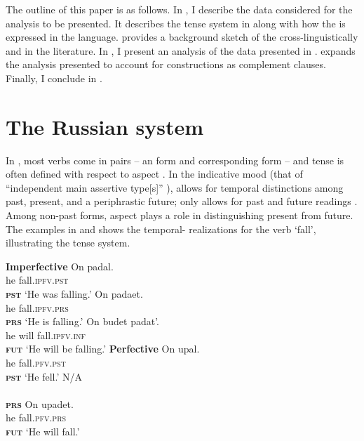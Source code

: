 \documentclass[output=paper,modfonts,newtxmath,hidelinks,]{langscibook}
\begin{document}
The outline of this paper is as follows. In , I describe the data considered for the analysis to be presented. It describes the tense system in  along with how the  is expressed in the language.  provides a background sketch of the  cross-linguistically and in the literature. In , I present an analysis of the data presented in .  expands the analysis presented to account for   constructions as complement clauses. Finally, I conclude in . 

\section{The Russian system}\label{10:s2}

In , most verbs come in  pairs \citep[371]{Mezhevich2008} – an  form and corresponding  form – and tense is often defined with respect to aspect \citep[373]{Mezhevich2008}. In the indicative mood (that of “independent main assertive  type[s]” \citep[1]{Wiltschko}),  allows for temporal distinctions among past, present, and a periphrastic future;  only allows for past and future readings \citep[371]{Mezhevich2008}. Among non-past forms, aspect plays a role in distinguishing present from future. The examples in  and  shows the temporal- realizations for the verb ‘fall’, illustrating the  tense system.

\begin{multicols}{2}
\ea \textbf{Imperfective}\label{10:ex:ipfv}
\ea\gll On padal.\\
he fall.\textsc{ipfv.pst}\\\hfill\textsc{\textbf{pst}}
\glt `He was falling.'
\ex\gll On padaet.\\
he fall.\textsc{ipfv.prs}\\\hfill\textsc{\textbf{prs}}
\glt `He is falling.'
\ex\gll On budet padat'.\\
he will fall.\textsc{ipfv.inf}\\\hfill\textsc{\textbf{fut}}
\glt `He will be falling.'
\z\z\columnbreak
\ea \textbf{Perfective}\label{10:ex:pfv}
\ea\gll On upal.\\
he fall.\textsc{pfv.pst}\\\hfill\textsc{\textbf{pst}}
\glt `He fell.'
\ex\gll N/A\\
{}\\\hfill\textsc{\textbf{prs}}
\glt {}\vspace{14pt}
\ex\gll On upadet.\\
he fall.\textsc{pfv.prs}\\\hfill\textsc{\textbf{fut}}
\glt `He will fall.'
\z\z

\end{multicols}
\end{document}
